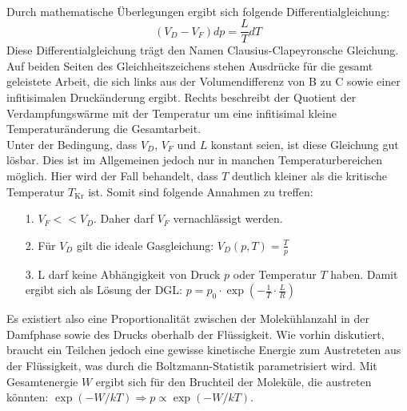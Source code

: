 \\
Durch mathematische Überlegungen ergibt sich folgende Differentialgleichung:
\begin{equation}
    (V_D-V_F)dp=\frac{L}{T}dT
\end{equation}
Diese Differentialgleichung trägt den Namen Clausius-Clapeyronsche Gleichung.
Auf beiden Seiten des Gleichheitszeichens stehen Ausdrücke für die gesamt
geleistete Arbeit, die sich links aus der Volumendifferenz von B zu C sowie einer infitisimalen
Druckänderung ergibt.
Rechts beschreibt der Quotient der Verdampfungswärme mit der Temperatur um eine infitisimal kleine
Temperaturänderung die Gesamtarbeit.\\
Unter der Bedingung, dass $V_D$, $V_F$ und $L$ konstant seien, ist diese Gleichung gut lösbar. Dies ist im
Allgemeinen jedoch nur in manchen Temperaturbereichen möglich. Hier wird der Fall behandelt, dass $T$ deutlich kleiner
als die kritische Temperatur $T_\text{Kr}$ ist.
\newpage
Somit sind folgende Annahmen zu treffen:
\begin{itemize}
    \item[1.] $V_F<<V_D$. Daher darf $V_F$ vernachlässigt werden.
    \item[2.] Für $V_D$ gilt die ideale Gasgleichung: $V_D(p,T)=\frac{T}{p}$
    \item[3.] L darf keine Abhängigkeit von Druck $p$ oder Temperatur $T$ haben. Damit
    ergibt sich als Lösung der DGL: $p=p_0\cdot \exp(-\frac{1}{T}\cdot\frac{L}{R})$
\end{itemize}
Es existiert also eine Proportionalität zwischen der Molekühlanzahl in der Damfphase sowie
des Drucks oberhalb der Flüssigkeit. Wie vorhin diskutiert, braucht ein Teilchen jedoch eine gewisse
kinetische Energie zum Austreteten aus der Flüssigkeit, was durch die Boltzmann-Statistik parametrisiert wird.
Mit Gesamtenergie $W$ ergibt sich für den Bruchteil der Moleküle, die austreten könnten:
$\exp(-W/kT)\Rightarrow p\propto \exp(-W/kT)$.
